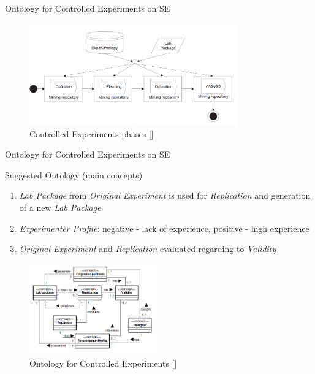 \documentclass[16:9,en,navbarside]{sdqbeamer}
\begin{document}
\begin{frame}{Ontology for Controlled Experiments on SE}
     \begin{figure}
		\includegraphics[width=9cm]{images/ExperOntology.png}
		\caption{Controlled Experiments phases [\cite{Gar11}]}
		\label{fig:ontforce}
	\end{figure}
\end{frame}

\begin{frame}{Ontology for Controlled Experiments on SE}
\begin{block}{Suggested Ontology (main concepts)}
\begin{multicols}{2}
\begin{enumerate}
		\item<1> \textit{Lab Package} from \textit{Original Experiment} is used for \textit{Replication} and generation of a new \textit{Lab Package}.
		\item<2>  \textit{Experimenter Profile}: negative - lack of experience, positive - high experience
		\item<3> \textit{Original Experiment} and \textit{Replication} evaluated regarding to \textit{Validity}	
\end{enumerate}
\begin{figure}
		\includegraphics[width=5.5cm]{images/OntforCE.PNG}
		\caption{Ontology for Controlled Experiments [\cite{Gar08}]}
		\label{fig:ontforce}
	\end{figure}
\end{multicols}
\end{block}
\end{frame}
\end{document}
